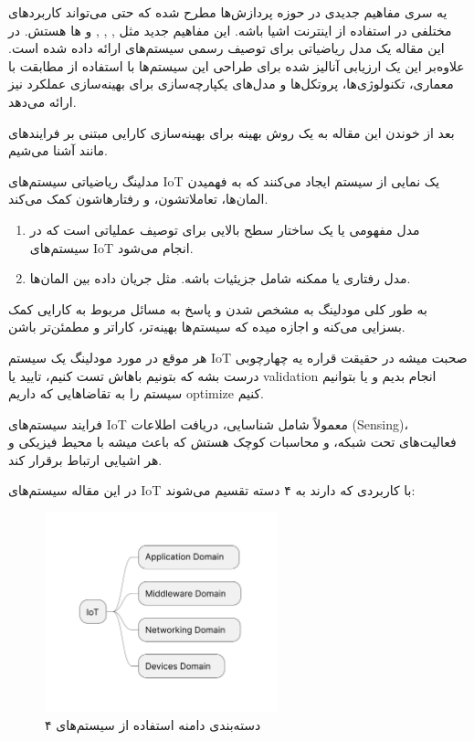 یه سری مفاهیم جدیدی در حوزه پردازش‌ها مطرح شده که حتی می‌تواند کاربرد‌های مختلفی
در استفاده از اینترنت اشیا باشه. این مفاهیم جدید مثل ,
, ,  و
 ‌ها هستش.  در این مقاله یک مدل ریاضیاتی برای توصیف رسمی سیستم‌های
 ارائه داده شده است.  علاوه‌بر این یک ارزیابی آنالیز شده برای طراحی این
سیستم‌ها با استفاده از مطابقت با معماری، تکنولوژی‌ها، پروتکل‌ها و مدل‌های
یکپارچه‌سازی برای بهینه‌سازی عملکرد نیز ارائه می‌دهد.


بعد از خوندن این مقاله به یک روش بهینه برای بهینه‌سازی کارایی مبتنی بر
فرایند‌های  مانند  آشنا می‌شیم.

مدلینگ ریاضیاتی سیستم‌های IoT یک نمایی از سیستم ایجاد می‌کنند که به فهمیدن
المان‌ها، تعاملاتشون، و رفتار‌هاشون کمک می‌کند.

\begin{enumerate}
    \item مدل مفهومی یا  یک ساختار سطح بالایی برای توصیف
    عملیاتی است که در سیستم‌های IoT انجام می‌شود.
    \item مدل رفتاری یا  ممکنه شامل جزیئیات باشه. مثل جریان
    داده بین المان‌ها.
\end{enumerate}

به طور کلی مودلینگ به مشخص شدن و پاسخ به مسائل مربوط به کارایی کمک بسزایی می‌کنه
و اجازه میده که سیستم‌ها بهینه‌تر، کاراتر و مطمئن‌تر باشن.

هر موقع در مورد مودلینگ یک سیستم IoT صحبت میشه در حقیقت قراره یه چهارچوبی درست
بشه که بتونیم باهاش تست کنیم، تایید یا validation انجام بدیم و یا بتوانیم سیستم
را به تقاضا‌هایی که داریم optimize کنیم.

فرایند سیستم‌های IoT معمولاً شامل شناسایی، دریافت اطلاعات (Sensing)، فعالیت‌های
تحت شبکه، و محاسبات کوچک هستش که باعث میشه با محیط فیزیکی و هر اشیایی ارتباط
برقرار کند.

در این مقاله سیستم‌های IoT با کاربردی که دارند به ۴ دسته تقسیم می‌شوند:

\begin{figure}[H]
  \centering
  \includegraphics[width=0.6\textwidth]{./figures/IoT_overall_domains.pdf}
  \caption{۴ دسته‌بندی دامنه استفاده از سیستم‌های }
  \label{fig:iotOverallDomains}
\end{figure}

